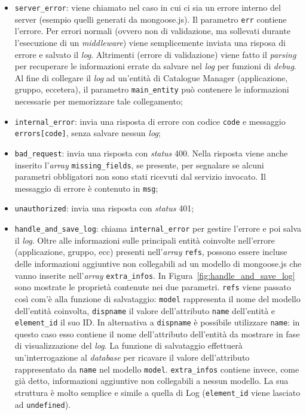 \begin{itemize}
\item \texttt{server\_error}: viene chiamato nel caso in cui ci sia un errore interno del server (esempio quelli generati da mongoose.js). Il parametro \texttt{err} contiene l'errore. Per errori normali (ovvero non di validazione, ma sollevati durante l'esecuzione di un \textit{middleware}) viene semplicemente inviata una risposa di errore e salvato il \textit{log}. Altrimenti (errore di validazione) viene fatto il \textit{parsing} per recuperare le informazioni errate da salvare nel \textit{log} per funzioni di \textit{debug}. Al fine di collegare il \textit{log} ad un'entità di Catalogue Manager (applicazione, gruppo, eccetera), il parametro \texttt{main\_entity} può contenere le informazioni necessarie per memorizzare tale collegamento;
\item \texttt{internal\_error}: invia una risposta di errore con codice \texttt{code} e messaggio \texttt{errors[code]}, senza salvare nessun \textit{log};
\item \texttt{bad\_request}: invia una risposta con \textit{status}  400. Nella risposta viene anche inserito l’\textit{array} \texttt{missing\_fields}, se presente, per segnalare se alcuni parametri obbligatori non sono stati ricevuti dal servizio invocato. Il messaggio di errore è contenuto in \texttt{msg};
\item \texttt{unauthorized}: invia una risposta con \textit{status}  401;
\item \texttt{handle\_and\_save\_log}: chiama \texttt{internal\_error} per gestire l'errore e poi salva il \textit{log}. Oltre alle informazioni sulle principali entità coinvolte nell'errore (applicazione, gruppo, ecc) presenti nell’\textit{array} \texttt{refs}, possono essere incluse delle informazioni aggiuntive non collegabili ad un modello di mongoose.js che vanno inserite nell’\textit{array} \texttt{extra\_infos}. In Figura~\ref{fig:handle_and_save_log} sono mostrate le proprietà contenute nei due parametri. \texttt{refs} viene passato così com'è alla funzione di salvataggio: \texttt{model} rappresenta il nome del modello dell'entità coinvolta, \texttt{dispname} il valore dell'attributo \texttt{name} dell'entità e \texttt{element\_id} il suo ID. In alternativa a \texttt{dispname} è possibile utilizzare \texttt{name}: in questo caso esso contiene il nome dell'attributo dell'entità da mostrare in fase di visualizzazione del \textit{log}. La funzione di salvataggio effettuerà un'interrogazione al \textit{database} per ricavare il valore dell'attributo rappresentato da \texttt{name} nel modello \texttt{model}. \texttt{extra\_infos} contiene invece, come già detto, informazioni aggiuntive non collegabili a nessun modello. La sua struttura è molto semplice e simile a quella di Log (\texttt{element\_id} viene lasciato ad \texttt{undefined}).

\end{itemize}
